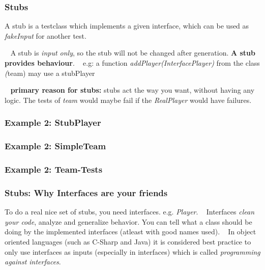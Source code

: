 \documentclass[12pt]{beamer}
\begin{document}
	\begin{frame}
		\frametitle{Stubs}
		A stub is a testclass which implements a given interface, which can be used as \textit{fakeInput} for another test. 
		
		~\newline
		A stub is \textit{input only}, so the stub will not be changed after generation. \textbf{A stub provides behaviour}. 
		~\newline
		e.g: a function \textit{addPlayer(InterfacePlayer)} from the class \textit(team) may use a stubPlayer
		
		~\newline
		\textbf{primary reason for stubs:} stubs act the way you want, without having any logic. The tests of \textit{team} would maybe fail if the \textit{RealPlayer} would have failures. 
	\end{frame}

	\begin{frame}
		\frametitle{Example 2: StubPlayer}
		\begin{small}
			
				
		\end{small}
	\end{frame}

	\begin{frame}
		\frametitle{Example 2: SimpleTeam}
		\begin{small}
				
		\end{small}
	\end{frame}

	\begin{frame}
		\frametitle{Example 2: Team-Tests}
		\begin{scriptsize}
				
		\end{scriptsize}
	\end{frame}

	\begin{frame}
		\frametitle{Stubs: Why Interfaces are your friends}
		To do a real nice set of stubs, you need interfaces. e.g. \textit{Player}. 
		~\newline
		Interfaces \textit{clean your code}, analyze and generalize behavior. You can tell what a class should be doing by the implemented interfaces (atleast with good names used).
		~\newline
		In object oriented languages (such as C-Sharp and Java) it is considered best practice to only use interfaces as inputs (especially in interfaces) which is called \textit{programming against interfaces}.
	\end{frame} 
\end{document}
